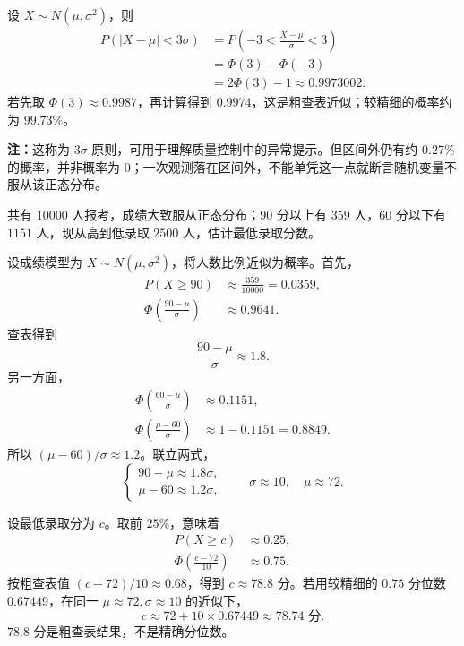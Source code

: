 \begin{example}[三倍尺度区间的概率]
设 $X\sim N(\mu,\sigma^2)$，则
\[
\begin{aligned}
P(|X-\mu|<3\sigma)
&=P\left(-3<\frac{X-\mu}{\sigma}<3\right)\\
&=\Phi(3)-\Phi(-3)\\
&=2\Phi(3)-1\approx0.9973002.
\end{aligned}
\]
若先取 $\Phi(3)\approx0.9987$，再计算得到 $0.9974$，这是粗查表近似；较精细的概率约为 $99.73\%$。

\textbf{注：}\quad 这称为 $3\sigma$ 原则，可用于理解质量控制中的异常提示。但区间外仍有约 $0.27\%$ 的概率，并非概率为 $0$；一次观测落在区间外，不能单凭这一点就断言随机变量不服从该正态分布。
\end{example}

\begin{example}[由两端比例估计录取分数线]
共有 $10000$ 人报考，成绩大致服从正态分布；$90$ 分以上有 $359$ 人，$60$ 分以下有 $1151$ 人，现从高到低录取 $2500$ 人，估计最低录取分数。

设成绩模型为 $X\sim N(\mu,\sigma^2)$，将人数比例近似为概率。首先，
\[
\begin{aligned}
P(X\geq90)&\approx\frac{359}{10000}=0.0359,\\
\Phi\left(\frac{90-\mu}{\sigma}\right)&\approx0.9641.
\end{aligned}
\]
查表得到
\[
\frac{90-\mu}{\sigma}\approx1.8.
\]
另一方面，
\[
\begin{aligned}
\Phi\left(\frac{60-\mu}{\sigma}\right)
&\approx0.1151,\\
\Phi\left(\frac{\mu-60}{\sigma}\right)
&\approx1-0.1151=0.8849.
\end{aligned}
\]
所以 $(\mu-60)/\sigma\approx1.2$。联立两式，
\[
\begin{cases}
90-\mu\approx1.8\sigma,\\
\mu-60\approx1.2\sigma,
\end{cases}
\qquad
\sigma\approx10,\quad \mu\approx72.
\]

设最低录取分为 $c$。取前 $25\%$，意味着
\[
\begin{aligned}
P(X\geq c)&\approx0.25,\\
\Phi\left(\frac{c-72}{10}\right)&\approx0.75.
\end{aligned}
\]
按粗查表值 $(c-72)/10\approx0.68$，得到 $c\approx78.8$ 分。若用较精细的 $0.75$ 分位数 $0.67449$，在同一 $\mu\approx72,\sigma\approx10$ 的近似下，
\[
c\approx72+10\times0.67449\approx78.74\text{ 分}.
\]
$78.8$ 分是粗查表结果，不是精确分位数。
\end{example}

